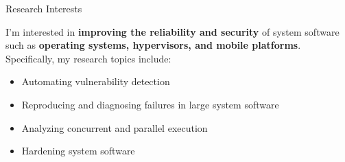 \begin{rSection}{Research Interests}
\newcommand{\eg}{\textit{e}.\textit{g}.\xspace}

I'm interested in \textbf{improving the reliability and security} of
system software such as \textbf{operating systems, hypervisors, and
  mobile platforms}. Specifically, my research topics include:

\begin{itemize}[leftmargin=*,itemsep=-5pt]
\item{Automating vulnerability detection}
\item{Reproducing and diagnosing failures in large system software}
\item{Analyzing concurrent and parallel execution}
\item{Hardening system software}
\end{itemize}


\end{rSection}
